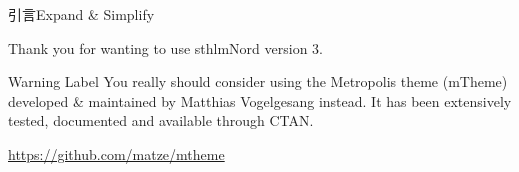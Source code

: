 \documentclass[\string~/GitHub/sthlmNordBeamerTheme/sthlmNordLightDemo.tex]{subfiles}
\begin{document}
\begin{frame}{引言}{Expand \& Simplify}

	Thank you for wanting to use sthlmNord version 3.

	\vspace{1em}
	\begin{alertblock}{Warning Label}
		\alert{You really should consider} using the Metropolis
		theme (mTheme) developed \& maintained by Matthias
		Vogelgesang instead. It has been extensively tested, documented and available through CTAN.
	\end{alertblock}
	\begin{center}
		\url{https://github.com/matze/mtheme}
	\end{center}
\end{frame}
\end{document}
